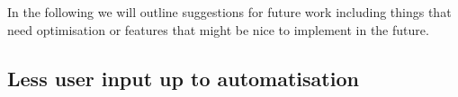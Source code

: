 In the following we will outline suggestions for future work including things that need optimisation or features that might be nice to implement in the future. 

%


%
%
%


\subsection{Less user input up to automatisation}

